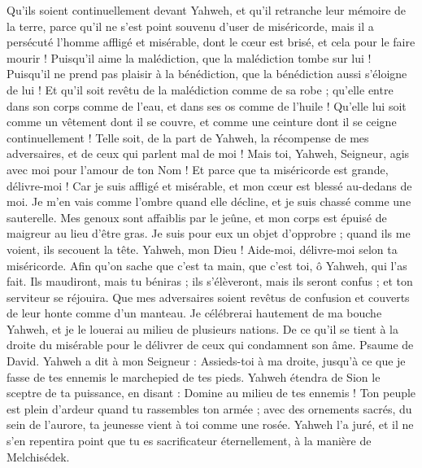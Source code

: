 \begin{multicols}{2}
Qu'ils soient continuellement devant Yahweh, et qu'il retranche leur mémoire de la terre,
parce qu'il ne s'est point souvenu d'user de miséricorde, mais il a persécuté l'homme affligé et misérable, dont le cœur est brisé, et cela pour le faire mourir !
Puisqu'il aime la malédiction, que la malédiction tombe sur lui ! Puisqu'il ne prend pas plaisir à la bénédiction, que la bénédiction aussi s'éloigne de lui !
Et qu'il soit revêtu de la malédiction comme de sa robe ; qu'elle entre dans son corps comme de l'eau, et dans ses os comme de l'huile !
Qu'elle lui soit comme un vêtement dont il se couvre, et comme une ceinture dont il se ceigne continuellement !
Telle soit, de la part de Yahweh, la récompense de mes adversaires, et de ceux qui parlent mal de moi !
Mais toi, Yahweh, Seigneur, agis avec moi pour l'amour de ton Nom ! Et parce que ta miséricorde est grande, délivre-moi !
Car je suis affligé et misérable, et mon cœur est blessé au-dedans de moi.
Je m'en vais comme l'ombre quand elle décline, et je suis chassé comme une sauterelle.
Mes genoux sont affaiblis par le jeûne, et mon corps est épuisé de maigreur au lieu d'être gras.
Je suis pour eux un objet d'opprobre ; quand ils me voient, ils secouent la tête.
Yahweh, mon Dieu ! Aide-moi, délivre-moi selon ta miséricorde.
Afin qu'on sache que c'est ta main, que c'est toi, ô Yahweh, qui l'as fait.
Ils maudiront, mais tu béniras ; ils s'élèveront, mais ils seront confus ; et ton serviteur se réjouira.
Que mes adversaires soient revêtus de confusion et couverts de leur honte comme d'un manteau.
Je célébrerai hautement de ma bouche Yahweh, et je le louerai au milieu de plusieurs nations.
De ce qu'il se tient à la droite du misérable pour le délivrer de ceux qui condamnent son âme.
\VerseOne{}Psaume de David. Yahweh a dit à mon Seigneur : Assieds-toi à ma droite, jusqu'à ce que je fasse de tes ennemis le marchepied de tes pieds.
Yahweh étendra de Sion le sceptre de ta puissance, en disant : Domine au milieu de tes ennemis !
Ton peuple est plein d'ardeur quand tu rassembles ton armée ; avec des ornements sacrés, du sein de l'aurore, ta jeunesse vient à toi comme une rosée.
Yahweh l'a juré, et il ne s'en repentira point que tu es sacrificateur éternellement, à la manière de Melchisédek.

\end{multicols}

